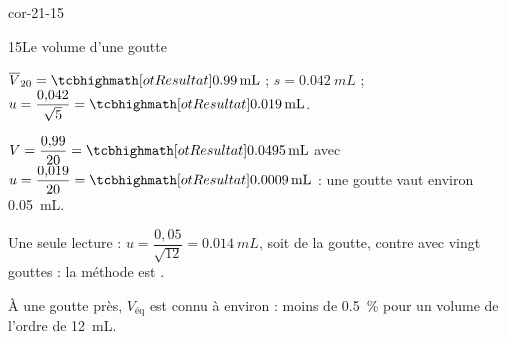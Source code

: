 \begin{blocLivre}{cor-21-15}
\begin{corrige}{15}{Le volume d'une goutte}
\begin{questions}
\item $\overline{V}_{20}=\res{\qty{0,99}{mL}}$ ; $s=\qty{0,042}{mL}$ ; $u=\dfrac{0{,}042}{\sqrt{5}}=\res{\qty{0,019}{mL}}$.
\item $V=\dfrac{0{,}99}{20}=\res{\qty{0,0495}{mL}}$ avec $u=\dfrac{0{,}019}{20}=\res{\qty{0,0009}{mL}}$ : une goutte vaut environ \qty{0,05}{mL}.
\item Une seule lecture : $u=\dfrac{0{,}05}{\sqrt{12}}=\qty{0,014}{mL}$, soit  de la goutte, contre  avec vingt gouttes :
la méthode est .
\item À une goutte près, $V_\text{éq}$ est connu à environ  : moins de \qty{0,5}{\percent} pour un volume de l'ordre de \qty{12}{mL}.
\end{questions}
\end{corrige}
\end{blocLivre}
